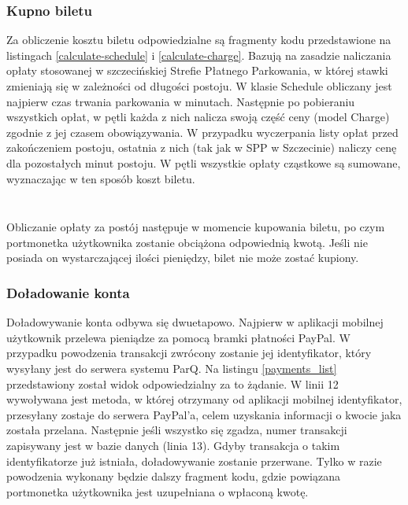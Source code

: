 \subsubsection*{Kupno biletu}

Za obliczenie kosztu biletu odpowiedzialne są fragmenty kodu przedstawione na listingach \ref{calculate-schedule} i \ref{calculate-charge}. Bazują na zasadzie naliczania opłaty stosowanej w szczecińskiej Strefie Płatnego Parkowania, w której stawki zmieniają się w zależności od długości postoju. W klasie Schedule obliczany jest najpierw czas trwania parkowania w minutach. Następnie po pobieraniu wszystkich opłat, w pętli każda z nich nalicza swoją część ceny (model Charge) zgodnie z jej czasem obowiązywania. W przypadku wyczerpania listy opłat przed zakończeniem postoju, ostatnia z nich (tak jak w SPP w Szczecinie) naliczy cenę dla pozostałych minut postoju. W pętli wszystkie opłaty cząstkowe są sumowane, wyznaczając w ten sposób koszt biletu.

\begin{singlespace}
	\label{calculate-schedule}
	\vspace{0.3cm}
	\inputminted[fontsize=\footnotesize, linenos=true]{python}{src/imp/schedule-calculate_price.py}
\end{singlespace}

\begin{singlespace}
	\label{calculate-charge}
	\vspace{0.3cm}
	\inputminted[fontsize=\footnotesize, linenos=true]{python}{src/imp/charge-calculate_price.py}
\end{singlespace}

\vspace{0.3cm}

Obliczanie opłaty za postój następuje w momencie kupowania biletu, po czym portmonetka użytkownika zostanie obciążona odpowiednią kwotą. Jeśli nie posiada on wystarczającej ilości pieniędzy, bilet nie może zostać kupiony.

\subsubsection*{Doładowanie konta}

Doładowywanie konta odbywa się dwuetapowo. Najpierw w aplikacji mobilnej użytkownik przelewa pieniądze za pomocą bramki płatności PayPal. W przypadku powodzenia transakcji zwrócony zostanie jej identyfikator, który wysyłany jest do serwera systemu ParQ. Na listingu \ref{payments_list} przedstawiony został widok odpowiedzialny za to żądanie. W linii 12 wywoływana jest metoda, w której otrzymany od aplikacji mobilnej identyfikator, przesyłany zostaje do serwera PayPal'a, celem uzyskania informacji o kwocie jaka została przelana. Następnie jeśli wszystko się zgadza, numer transakcji zapisywany jest w bazie danych (linia 13). Gdyby transakcja o takim identyfikatorze już istniała, doładowywanie zostanie przerwane. Tylko w razie powodzenia wykonany będzie dalszy fragment kodu, gdzie powiązana portmonetka użytkownika jest uzupełniana o wpłaconą kwotę.

